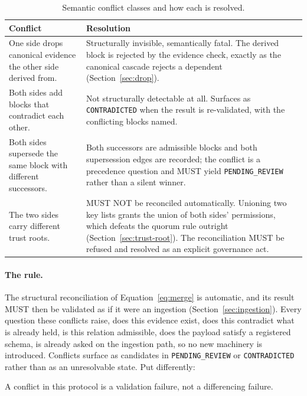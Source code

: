\documentclass[11pt,a4paper]{article}
\begin{document}
\begin{table}[htbp]
\centering
\caption{Semantic conflict classes and how each is resolved.}
\label{tab:conflicts}
\begin{tabularx}{\textwidth}{YY}
\toprule
\textbf{Conflict} & \textbf{Resolution} \\
\midrule
One side drops canonical evidence the other side derived from. &
  Structurally invisible, semantically fatal. The derived block is rejected by
  the evidence check, exactly as the canonical cascade rejects a dependent
  (Section~\ref{sec:drop}). \\
Both sides add blocks that contradict each other. &
  Not structurally detectable at all. Surfaces as
  \texttt{CONTRADICTED} when the result is re-validated, with the conflicting
  blocks named. \\
Both sides supersede the same block with different successors. &
  Both successors are admissible blocks and both supersession edges are
  recorded; the conflict is a precedence question and MUST yield
  \texttt{PENDING\_REVIEW} rather than a silent winner. \\
The two sides carry different trust roots. &
  MUST NOT be reconciled automatically. Unioning two key lists grants the union
  of both sides' permissions, which defeats the quorum rule outright
  (Section~\ref{sec:trust-root}). The reconciliation MUST be refused and
  resolved as an explicit governance act. \\
\bottomrule
\end{tabularx}
\end{table}

\paragraph{The rule.}
The structural reconciliation of Equation~\ref{eq:merge} is automatic, and its
result MUST then be validated as if it were an ingestion
(Section~\ref{sec:ingestion}). Every question these conflicts raise, does this
evidence exist, does this contradict what is already held, is this relation
admissible, does the payload satisfy a registered schema, is already asked on the
ingestion path, so no new machinery is introduced. Conflicts surface as
candidates in \texttt{PENDING\_REVIEW} or \texttt{CONTRADICTED} rather than as an
unresolvable state. Put differently:

\begin{callout}
A conflict in this protocol is a validation failure, not a differencing failure.
\end{callout}
\end{document}
